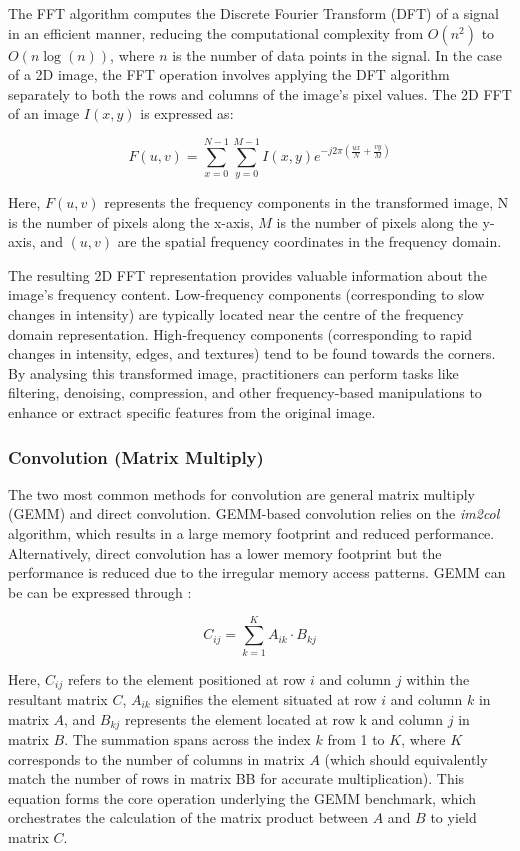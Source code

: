 The FFT algorithm computes the Discrete Fourier Transform (DFT) of a signal in an efficient manner, reducing the computational complexity from $O(n^2)$ to $O(n \log (n))$, where $n$ is the number of data points in the signal. In the case of a 2D image, the FFT operation involves applying the DFT algorithm separately to both the rows and columns of the image's pixel values. The 2D FFT of an image $I(x, y)$ is expressed as:

\begin{equation}
F(u, v) = \sum_{x=0}^{N-1} \sum_{y=0}^{M-1} I(x, y) e^{-j 2 \pi \left(\frac{u x}{N} + \frac{v y}{M}\right)}
\end{equation}

Here, $F(u, v)$ represents the frequency components in the transformed image, N is the number of pixels along the x-axis, $M$ is the number of pixels along the y-axis, and $(u, v)$ are the spatial frequency coordinates in the frequency domain.

The resulting 2D FFT representation provides valuable information about the image's frequency content. Low-frequency components (corresponding to slow changes in intensity) are typically located near the centre of the frequency domain representation. High-frequency components (corresponding to rapid changes in intensity, edges, and textures) tend to be found towards the corners. By analysing this transformed image, practitioners can perform tasks like filtering, denoising, compression, and other frequency-based manipulations to enhance or extract specific features from the original image.



\subsubsection{Convolution (Matrix Multiply)}
The two most common methods for convolution are general matrix multiply (GEMM) and direct convolution. GEMM-based convolution relies on the \textit{im2col} algorithm\cite{CheKumPur06}, which results in a large memory footprint and reduced performance. Alternatively, direct convolution has a lower memory footprint but the performance is reduced due to the irregular memory access patterns. GEMM can be  can be expressed through :

\begin{equation}\label{eq:GEMM}
C_{ij} = \sum_{k=1}^{K} A_{ik} \cdot B_{kj}
\end{equation}

Here, $C_{ij}$ refers to the element positioned at row $i$ and column $j$ within the resultant matrix $C$, $A_{ik}$ signifies the element situated at row $i$ and column $k$ in matrix $A$, and $B_{kj}$ represents the element located at row k and column $j$ in matrix $B$. The summation spans across the index $k$ from 1 to $K$, where $K$ corresponds to the number of columns in matrix $A$ (which should equivalently match the number of rows in matrix BB for accurate multiplication). This equation forms the core operation underlying the GEMM benchmark, which orchestrates the calculation of the matrix product between $A$ and $B$ to yield matrix $C$.


